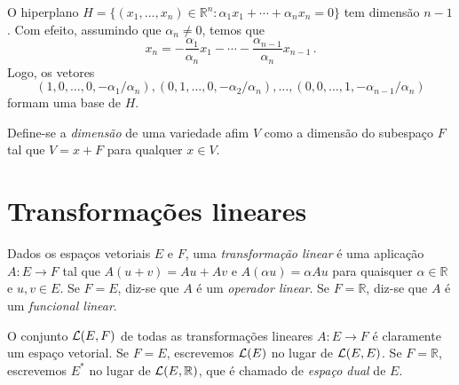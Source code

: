 \documentclass[12pt,a4paper]{article}
\newcommand{\R}{\mathbb{R}}
\theoremstyle{definition}
\begin{document}
O hiperplano
$H=\{(x_1,\ldots,x_n)\in\R^n:\alpha_1x_1+\cdots+\alpha_nx_n=0\}$ tem
dimensão $n-1$. Com efeito, assumindo que $\alpha_n\ne 0$, temos que
$$x_n=-\frac{\alpha_1}{\alpha_n}x_1-\cdots-\frac{\alpha_{n-1}}{\alpha_n}x_{n-1}\,.$$
Logo, os vetores
$$(1,0,\ldots,0,-\alpha_1/\alpha_n),(0,1,\ldots,0,-\alpha_2/\alpha_n),\ldots,(0,0,\ldots,1,-\alpha_{n-1}/\alpha_n)$$
formam uma base de $H$.

Define-se a \textit{dimensão} de uma variedade afim $V$ como a
dimensão do subespaço $F$ tal que $V=x+F$ para qualquer $x\in V$.

\section{Transformações lineares}

Dados os espaços vetoriais $E$ e $F$, uma \textit{transformação
  linear} é uma aplicação $A:E\to F$ tal que $A(u+v)=Au+Av$ e
$A(\alpha u)=\alpha Au$ para quaisquer $\alpha\in\R$ e $u,v\in E$. Se
$F=E$, diz-se que $A$ é um \textit{operador linear}. Se $F=\R$, diz-se
que $A$ é um \textit{funcional linear}.

O conjunto ${\cal L}(E,F)$ de todas as transformações lineares
$A:E\to F$ é claramente um espaço vetorial. Se $F=E$, escrevemos
${\cal L}(E)$ no lugar de ${\cal L}(E,E)$. Se $F=\R$, escrevemos $E^*$
no lugar de ${\cal L}(E,\R)$, que é chamado de \textit{espaço dual} de
$E$.
\end{document}
